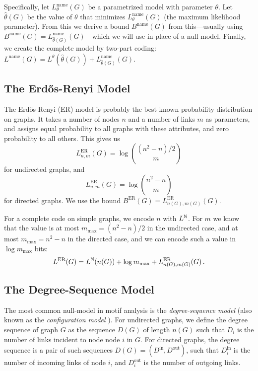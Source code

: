 Specifically, let $L^\text{name}_\theta(G)$ be a parametrized model with parameter $\theta$. Let $\hat\theta(G)$ be the value of $\theta$ that minimizes $L^\text{name}_\theta(G)$ (the maximum likelihood parameter). From this we derive a bound $B^\text{name}(G)$ from this---usually using $B^\text{name}(G) = L^\text{name}_{\hat\theta(G)}(G)$---which we will use in place of a null-model. Finally, we create the complete model by two-part coding: $L^\text{name}(G) = L^{\theta}(\hat\theta(G)) + L^\text{name}_{\hat\theta(G)}(G)$. 

\subsection*{The Erd\H{o}s-Renyi Model}

The Erd\H{o}s-Renyi (ER) model is probably the best known probability distribution on graphs\cite{renyi1959random,gilbert1959random}. It takes a number of nodes $n$ and a number of links $m$ as parameters, and assigns equal probability to all graphs with these attributes, and zero probability to all others. This gives us 
\[
L^\text{ER}_{n, m}(G) = \log{(n^2-n)/2 \choose m} 
\] 
for undirected graphs, and 
\[
L^\text{ER}_{n, m}(G) = \log{n^2-n \choose m} 
\] 
for directed graphs. We use the bound $B^\text{ER}(G) = L^\text{ER}_{n(G), m(G)}(G)$.

For a complete code on simple graphs, we encode $n$ with $L^{\mathbb N}$. For $m$ we know that the value is at most $m_\text{max}=(n^2-n)/2$ in the undirected case, and at most $m_\text{max}=n^2-n$ in the directed case, and we can encode such a value in $\log m_\text{max}$ bits: 
\[
L^\text{ER}(G) = L^{\mathbb N}(n(G)) + \log m_\text{max} + L^\text{ER}_{n(G), m(G)}(G)\,\text{.}
\]
 
\subsection*{The Degree-Sequence Model}
\label{section:degree-sequence-model}

The most common null-model in motif analysis is the \emph{degree-sequence model} (also known as the \emph{configuration model} \cite{newman2010networks}). 
For undirected graphs, we define the degree sequence of graph $G$ as the sequence $D(G)$ of length $n(G)$ such that $D_i$ is the number of links incident to node node $i$ in $G$. For directed graphs, the degree sequence is a pair of such sequences $D(G) = (D^\text{in}, D^\text{out})$, such that $D^\text{in}_i$ is the number of incoming links of node $i$, and $D^\text{out}_i$ is the number of outgoing links.

